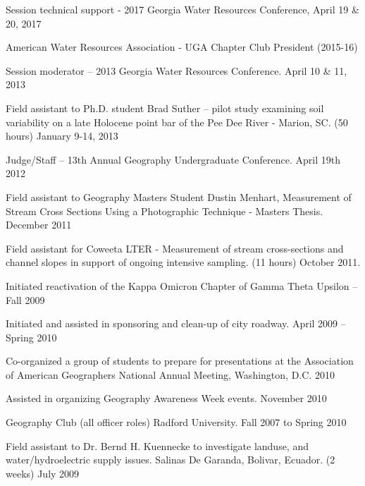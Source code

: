 \documentclass[10pt,letterpaper]{article}
\newenvironment{indentsection}[1]%
{\begin{list}{}%
	{\setlength{\leftmargin}{#1}}%
	\item[]%
}
{\end{list}}
\begin{document}
	\begin{itemize*}

	\item
	Session technical support - 2017 Georgia Water Resources Conference, April 19 \& 20, 2017
	\item
	American Water Resources Association - UGA Chapter Club President (2015-16)
	\item
	Session moderator – 2013 Georgia Water Resources Conference. April 10 \& 11, 2013
	\item
	Field assistant to Ph.D. student Brad Suther – pilot study examining soil variability on a late Holocene point bar of the Pee Dee River - Marion, SC. (50 hours) January 9-14, 2013
	\item
	Judge/Staff – 13th Annual Geography Undergraduate Conference. April 19th 2012
	\item
	Field assistant to Geography Masters Student Dustin Menhart, Measurement of Stream Cross Sections Using a Photographic Technique - Masters Thesis. December 2011
	\item 
	Field assistant for Coweeta LTER - Measurement of stream cross-sections and channel slopes in support of ongoing intensive sampling. (11 hours) October 2011.
	\item 
	Initiated reactivation of the Kappa Omicron Chapter of Gamma Theta Upsilon – Fall 2009
	\item 
	Initiated and assisted in sponsoring and clean-up of city roadway. April 2009 – Spring 2010
	\item 
	Co-organized a group of students to prepare for presentations at the Association of American Geographers National Annual Meeting, Washington, D.C. 2010
	\item 
	Assisted in organizing Geography Awareness Week events. November 2010
	\item 
	Geography Club (all officer roles) Radford University. Fall 2007 to Spring 2010
	\item 
	Field assistant to Dr. Bernd H. Kuennecke to investigate landuse, and water/hydroelectric supply issues. Salinas De Garanda, Bolivar, Ecuador. (2 weeks) July 2009


\end{itemize*}


	
\end{document}
